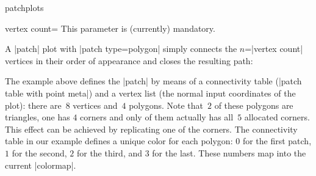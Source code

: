 {\begin{pgfplotslibrary}{patchplots}
\begin{pgfplotskey}{vertex count=}
		This parameter is (currently) mandatory.
	\end{pgfplotskey}
	A |patch| plot with |patch type=polygon| simply connects the $n$=|vertex count| vertices in their order of appearance and closes the resulting path:
\begin{codeexample}[]
\end{codeexample}
	\noindent The example above defines the |patch| by means of a connectivity table (|patch table with point meta|) and a vertex list (the normal input coordinates of the plot): there are~$8$ vertices and~$4$ polygons. Note that~$2$ of these polygons are triangles, one has $4$ corners and only of them actually has all~$5$ allocated corners. This effect can be achieved by replicating one of the corners. The connectivity table in our example defines a unique color for each polygon: $0$ for the first patch, $1$ for the second, $2$ for the third, and $3$ for the last. These numbers map into the current |colormap|.
	

\end{pgfplotslibrary}}
